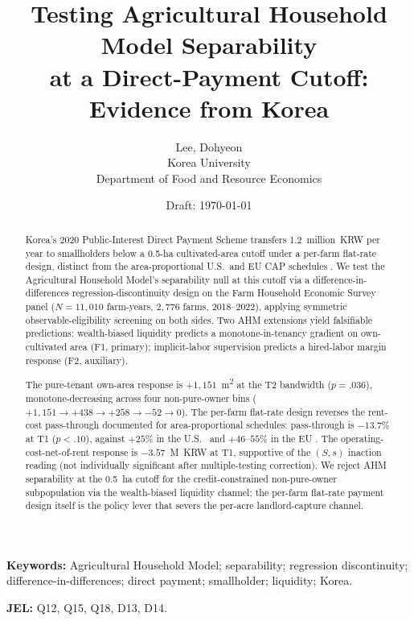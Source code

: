 \documentclass[12pt, a4paper]{article}
\title{Testing Agricultural Household Model Separability\\
       at a Direct-Payment Cutoff: Evidence from Korea}
\author{Lee, Dohyeon\\
        Korea University \\
        Department of Food and Resource Economics}
\date{Draft: \today}
\begin{document}
\maketitle

\begin{abstract}
\noindent
Korea's 2020 Public-Interest Direct Payment Scheme transfers 1.2~million~KRW per year to smallholders below a 0.5-ha cultivated-area cutoff under a per-farm flat-rate design, distinct from the area-proportional U.S.\ and EU CAP schedules \citep{Kirwan2009_rentcap, BaldoniCiaian2023_eucap}. We test the Agricultural Household Model's separability null at this cutoff via a difference-in-differences regression-discontinuity design on the Farm Household Economic Survey panel ($N = 11{,}010$ farm-years, $2{,}776$ farms, 2018--2022), applying symmetric observable-eligibility screening on both sides. Two AHM extensions yield falsifiable predictions: wealth-biased liquidity \citep{CarterOlinto2003_liquidity} predicts a monotone-in-tenancy gradient on own-cultivated area (F1, primary); implicit-labor supervision \citep{EswaranKotwal1986_supervision} predicts a hired-labor margin response (F2, auxiliary).

The pure-tenant own-area response is $+1{,}151$~m\textsuperscript{2} at the T2 bandwidth ($p = .036$), monotone-decreasing across four non-pure-owner bins ($+1{,}151 \to +438 \to +258 \to -52 \to 0$). The per-farm flat-rate design reverses the rent-cost pass-through documented for area-proportional schedules: pass-through is $-13.7\%$ at T1 ($p < .10$), against $+25\%$ in the U.S.\ \citep{Kirwan2009_rentcap} and $+46$--$55\%$ in the EU \citep{BaldoniCiaian2023_eucap}. The operating-cost-net-of-rent response is $-3.57$~M~KRW at T1, supportive of the $(S,s)$ inaction reading (not individually significant after multiple-testing correction). We reject AHM separability at the 0.5~ha cutoff for the credit-constrained non-pure-owner subpopulation via the wealth-biased liquidity channel; the per-farm flat-rate payment design itself is the policy lever that severs the per-acre landlord-capture channel.
\end{abstract}

\noindent\textbf{Keywords:} Agricultural Household Model; separability; regression discontinuity; difference-in-differences; direct payment; smallholder; liquidity; Korea.

\noindent\textbf{JEL:} Q12, Q15, Q18, D13, D14.

\bigskip

\end{document}
